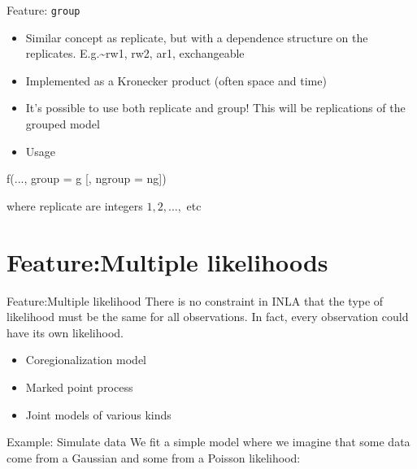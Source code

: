 \documentclass[
  ignorenonframetext,
]{beamer}
\newenvironment{Shaded}{\begin{snugshade}}{\end{snugshade}}
\newcommand{\AttributeTok}[1]{\textcolor[rgb]{0.77,0.63,0.00}{#1}}
\newcommand{\FunctionTok}[1]{\textcolor[rgb]{0.00,0.00,0.00}{#1}}
\newcommand{\NormalTok}[1]{#1}
\begin{document}
\begin{frame}[fragile]{Feature: \texttt{group}}
\protect\hypertarget{feature-group}{}
\begin{itemize}
\item
  Similar concept as replicate, but with a dependence structure on the
  replicates. E.g.\textasciitilde rw1, rw2, ar1, exchangeable
\item
  Implemented as a Kronecker product (often space and time)
\item
  It's possible to use both replicate and group! This will be
  replications of the grouped model
\item
  Usage
\end{itemize}

\begin{Shaded}
\begin{Highlighting}[]
    \FunctionTok{f}\NormalTok{(..., }\AttributeTok{group =}\NormalTok{ g [, }\AttributeTok{ngroup =}\NormalTok{ ng])}
\end{Highlighting}
\end{Shaded}

where replicate are integers \(1, 2, \ldots,\) etc
\end{frame}

\hypertarget{featuremultiple-likelihoods}{%
\section{Feature:Multiple
likelihoods}\label{featuremultiple-likelihoods}}

\begin{frame}{Feature:Multiple likelihood}
\protect\hypertarget{featuremultiple-likelihood}{}
There is no constraint in INLA that the type of likelihood must be the
same for all observations. In fact, every observation could have its own
likelihood.

\begin{itemize}
\item
  Coregionalization model
\item
  Marked point process
\item
  Joint models of various kinds
\end{itemize}
\end{frame}

\begin{frame}{Example: Simulate data}
\protect\hypertarget{example-simulate-data-2}{}
We fit a simple model where we imagine that some data come from a
Gaussian and some from a Poisson likelihood: \tiny

\normalsize
\end{frame}
\end{document}
